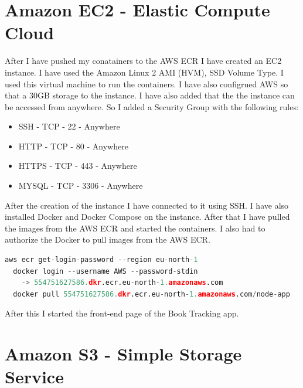 \documentclass[11pt,a4paper,oneside]{report}
\begin{document}
\section{Amazon EC2 - Elastic Compute Cloud}
After I have pushed my conatainers to the AWS ECR I have created an EC2 instance.
I have used the Amazon Linux 2 AMI (HVM), SSD Volume Type. I used this virtual machine to run the containers. I have also configrued AWS so that a 30GB storage to the instance. I have also added that the the instance can be accessed from anywhere. So I added a Security Group with the following rules:
\begin{itemize}
  \item SSH - TCP - 22 - Anywhere
  \item HTTP - TCP - 80 - Anywhere
  \item HTTPS - TCP - 443 - Anywhere
  \item MYSQL - TCP - 3306 - Anywhere
\end{itemize}

After the creation of the instance I have connected to it using SSH.
I have also installed Docker and Docker Compose on the instance.
After that I have pulled the images from the AWS ECR and started the containers.
I also had to authorize the Docker to pull images from the AWS ECR.


\begin{lstlisting}[language=Python,basicstyle=\ttfamily\small,]
  aws ecr get-login-password --region eu-north-1 
  docker login --username AWS --password-stdin 
    -> 554751627586.dkr.ecr.eu-north-1.amazonaws.com
  docker pull 554751627586.dkr.ecr.eu-north-1.amazonaws.com/node-app
\end{lstlisting}



After this I started the front-end page of the Book Tracking app.

\section{Amazon S3 - Simple Storage Service}
\end{document}
